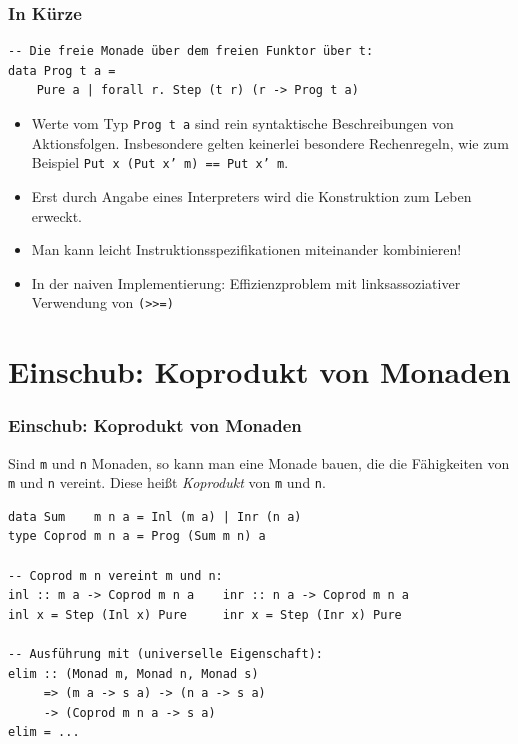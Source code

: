 \documentclass[12pt,compress,ngerman,utf8,t]{beamer}
\begin{document}
\begin{frame}[fragile]\frametitle{In Kürze}
  \begin{verbatim}
-- Die freie Monade über dem freien Funktor über t:
data Prog t a =
    Pure a | forall r. Step (t r) (r -> Prog t a)
  \end{verbatim}

  \begin{itemize}
    \item Werte vom Typ \texttt{Prog t a} sind rein syntaktische Beschreibungen
    von Aktionsfolgen.
    Insbesondere gelten keinerlei besondere Rechenregeln, wie zum
    Beispiel \texttt{Put x (Put x' m) == Put x' m}.
    \item Erst durch Angabe eines Interpreters wird die Konstruktion zum Leben
    erweckt.
    \item Man kann leicht Instruktionsspezifikationen miteinander kombinieren!
    \item In der naiven Implementierung: Effizienzproblem mit linksassoziativer
    Verwendung von \texttt{(>{}>=)}
  \end{itemize}
\end{frame}



\section{Einschub: Koprodukt von Monaden}

\begin{frame}[fragile]\frametitle{Einschub: Koprodukt von Monaden}
  Sind \texttt{m} und \texttt{n} Monaden, so kann man eine Monade bauen, die
  die Fähigkeiten von \texttt{m} und \texttt{n} vereint. Diese heißt
  \emph{Koprodukt} von \texttt{m} und \texttt{n}.
  \medskip

  \small
  \begin{verbatim}
data Sum    m n a = Inl (m a) | Inr (n a)
type Coprod m n a = Prog (Sum m n) a

-- Coprod m n vereint m und n:
inl :: m a -> Coprod m n a    inr :: n a -> Coprod m n a
inl x = Step (Inl x) Pure     inr x = Step (Inr x) Pure

-- Ausführung mit (universelle Eigenschaft):
elim :: (Monad m, Monad n, Monad s)
     => (m a -> s a) -> (n a -> s a)
     -> (Coprod m n a -> s a)
elim = ...
  \end{verbatim}
\end{frame}
\end{document}
